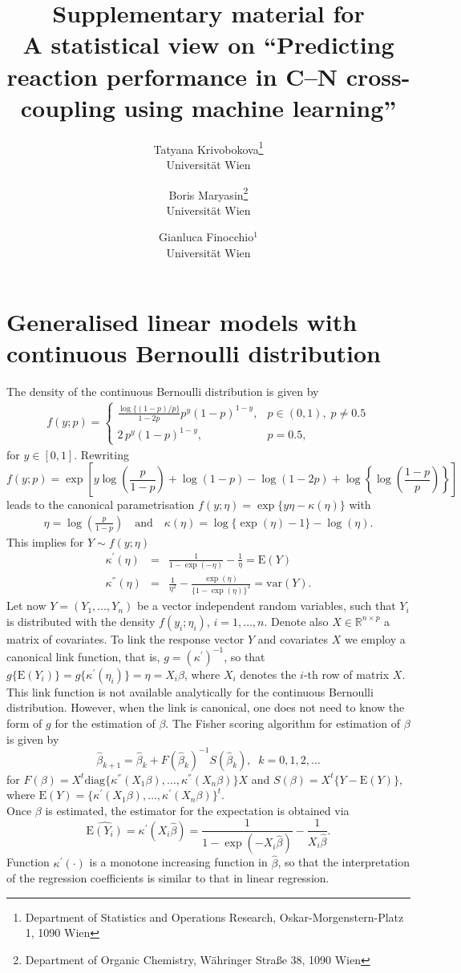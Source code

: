 \documentclass[12pt]{article}
\title{Supplementary material for\\
A statistical view on ``Predicting reaction performance in C--N cross-coupling using machine learning''}
\author{Tatyana Krivobokova\footnote{Department of Statistics and Operations Research,
Oskar-Morgenstern-Platz 1, 1090 Wien}\\{Universit\"at Wien}
\and Boris Maryasin\footnote{Department of Organic Chemistry, W\"ahringer Stra{\ss}e 38, 1090 Wien}\\{Universit\"at Wien}
\and Gianluca Finocchio$^1$\\{Universit\"at Wien}
}
\def\E{\mbox{E}}
\def\beqn{\begin{eqnarray*}}
\def\eeqn{\end{eqnarray*}}
\def\var{\mbox{var}}
\begin{document}
\baselineskip=25pt

\maketitle




\baselineskip=20pt
\doublespacing
\linespread{1.2}


\section{Generalised linear models with continuous Bernoulli distribution }
The density of the continuous Bernoulli distribution is given by
\beqn
f(y;p)=\begin{cases}
	\frac{\log\{(1-p)/p\}}{1-2p}p^y(1-p)^{1-y},&p\in(0,1), \;p\neq 0.5\\
	2\,p^y(1-p)^{1-y},&p=0.5,
\end{cases}
\eeqn 
for $y\in[0,1]$. Rewriting
$$
f(y;p)=\exp\left[y\log\left(\frac{p}{1-p}\right)+\log(1-p)-\log(1-2p)+\log\left\{\log\left(\frac{1-p}{p}\right)\right\}\right]$$
leads to the canonical parametrisation $f(y;\eta)=\exp\{y\eta-\kappa(\eta)\}$ with
\beqn
\eta=\log\left(\frac{p}{1-p}\right)\quad\mbox{and}\quad \kappa(\eta)=\log\{\exp(\eta)-1\}-\log(\eta).
\eeqn 
This implies for $Y\sim f(y;\eta)$
\beqn
\kappa^{'}(\eta)&=&\frac{1}{1-\exp(-\eta)}-\frac{1}{\eta}=\E(Y)\\
\kappa^{''}(\eta)&=&\frac{1}{\eta^2}-\frac{\exp(\eta)}{\{1-\exp(\eta)\}^2}=\var(Y).
\eeqn 
Let now $Y=(Y_1,\ldots,Y_n)$ be a vector independent random variables, such that $Y_i$ is distributed with the density $f(y_i;\eta_i)$, $i=1,\ldots,n$. Denote also $X\in\mathbb{R}^{n\times p}$ a matrix of covariates. To link the response vector $Y$ and covariates $X$ we employ a canonical link function, that is, $g=(\kappa^{'})^{-1}$, so that $g\{\E(Y_i)\}=g\{\kappa^{'}(\eta_i)\}=\eta=X_i\beta$, where $X_i$ denotes the $i$-th row of matrix $X$. This link function is not available analytically for the continuous Bernoulli distribution. However, when the link is canonical, one does not need to know the form of $g$ for the estimation of $\beta$. %
The Fisher scoring algorithm for estimation of $\beta$ is given by
$$
\hat\beta_{k+1}=\hat\beta_k+F(\hat\beta_k)^{-1}S(\hat\beta_k),\;\;k=0,1,2,\ldots
$$
for $F(\beta)=X^t\mbox{diag}\{\kappa^{''}(X_1\beta),\ldots,\kappa^{''}(X_n\beta)\}X$ and $S(\beta)=X^t\{Y-\E(Y)\}$, where $\E(Y)=\{\kappa^{'}(X_1\beta),\ldots,\kappa^{'}(X_n\beta)\}^t$. \\
Once $\beta$ is estimated, the estimator for the expectation is obtained via
$$
\widehat{\E(Y_i)}=\kappa^{'}(X_i\hat\beta)=\frac{1}{1-\exp(-X_i\hat\beta)}-\frac{1}{X_i\hat\beta}.
$$
Function $\kappa^{'}(\cdot)$ is a monotone increasing function in $\hat\beta$, so that the interpretation of the regression coefficients is similar to that in linear regression.
\end{document}
